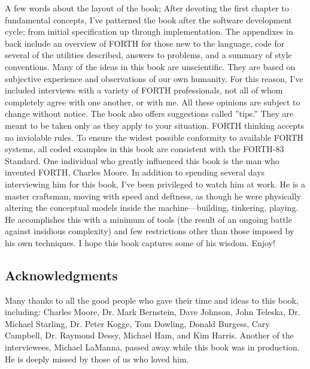 A few words about the layout of the book; After devoting the first
chapter to fundamental concepts, I've patterned the book after the
software development cycle; from initial specification up through
implementation. The appendixes in back include an overview of FORTH
for those new to the language, code for several of the utilities described,
answers to problems, and a summary of style conventions. Many of the
ideas in this book are unscientific. They are based on subjective
experience and observations of our own humanity. For this reason,
I've included interviews with a variety of FORTH professionals, not
all of whom completely agree with one another, or with me. All these
opinions are subject to change without notice. The book also offers
suggestions called ''tips.'' They are meant to be taken only as they
apply to your situation. FORTH thinking accepts no inviolable rules.
To ensure the widest possible conformity to available FORTH systems,
all coded examples in this book are consistent with the FORTH-83 Standard.
One individual who greatly influenced this book is the man who invented
FORTH, Charles Moore. In addition to spending several days interviewing
him for this book, I've been privileged to watch him at work. He is
a master craftsman, moving with speed and deftness, as though he were
physically altering the conceptual models inside the machine---building,
tinkering, playing. He accomplishes this with a minimum of tools (the
result of an ongoing battle against insidious complexity) and few
restrictions other than those imposed by his own techniques. I hope
this book captures some of his wisdom. Enjoy!


\subsection{Acknowledgments}

Many thanks to all the good people who gave their time and ideas to
this book, including: Charles Moore, Dr. Mark Bernstein, Dave Johnson,
John Teleska, Dr. Michael Starling, Dr. Peter Kogge, Tom Dowling,
Donald Burgess, Cary Campbell, Dr. Raymond Dessy, Michael Ham, and
Kim Harris. Another of the interviewees, Michael LaManna, passed away
while this book was in production. He is deeply missed by those of
us who loved him. 

